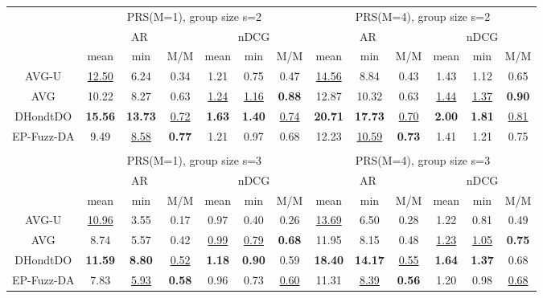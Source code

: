 \begin{tabular}{ c | c c c | c c c || c c c | c c c }

\multicolumn{1}{c}{} & \multicolumn{6}{c}{PRS(M=1), group size s=2} & \multicolumn{6}{c}{PRS(M=4), group size s=2} \\
\multicolumn{1}{c}{} & \multicolumn{3}{c}{AR} & \multicolumn{3}{c}{nDCG} & \multicolumn{3}{c}{AR} & \multicolumn{3}{c}{nDCG} \\
& mean & min & M/M & mean & min & M/M & mean & min & M/M & mean & min & M/M \\
\hline
AVG-U & \underline{12.50} & 6.24 & 0.34 & 1.21 & 0.75 & 0.47 & \underline{14.56} & 8.84 & 0.43 & 1.43 & 1.12 & 0.65 \\
AVG & 10.22 & 8.27 & 0.63 & \underline{1.24} & \underline{1.16} & \textbf{0.88} & 12.87 & 10.32 & 0.63 & \underline{1.44} & \underline{1.37} & \textbf{0.90} \\
DHondtDO & \textbf{15.56} & \textbf{13.73} & \underline{0.72} & \textbf{1.63} & \textbf{1.40} & \underline{0.74} & \textbf{20.71} & \textbf{17.73} & \underline{0.70} & \textbf{2.00} & \textbf{1.81} & \underline{0.81} \\
EP-Fuzz-DA & 9.49 & \underline{8.58} & \textbf{0.77} & 1.21 & 0.97 & 0.68 & 12.23 & \underline{10.59} & \textbf{0.73} & 1.41 & 1.21 & 0.75 \\

\multicolumn{12}{c}{} \\
\multicolumn{1}{c}{} & \multicolumn{6}{c}{PRS(M=1), group size s=3} & \multicolumn{6}{c}{PRS(M=4), group size s=3} \\
\multicolumn{1}{c}{} & \multicolumn{3}{c}{AR} & \multicolumn{3}{c}{nDCG} & \multicolumn{3}{c}{AR} & \multicolumn{3}{c}{nDCG} \\
& mean & min & M/M & mean & min & M/M & mean & min & M/M & mean & min & M/M \\
\hline
AVG-U & \underline{10.96} & 3.55 & 0.17 & 0.97 & 0.40 & 0.26 & \underline{13.69} & 6.50 & 0.28 & 1.22 & 0.81 & 0.49 \\
AVG & 8.74 & 5.57 & 0.42 & \underline{0.99} & \underline{0.79} & \textbf{0.68} & 11.95 & 8.15 & 0.48 & \underline{1.23} & \underline{1.05} & \textbf{0.75} \\
DHondtDO & \textbf{11.59} & \textbf{8.80} & \underline{0.52} & \textbf{1.18} & \textbf{0.90} & 0.59 & \textbf{18.40} & \textbf{14.17} & \underline{0.55} & \textbf{1.64} & \textbf{1.37} & 0.68 \\
EP-Fuzz-DA & 7.83 & \underline{5.93} & \textbf{0.58} & 0.96 & 0.73 & \underline{0.60} & 11.31 & \underline{8.39} & \textbf{0.56} & 1.20 & 0.98 & \underline{0.68} \\


\end{tabular}
